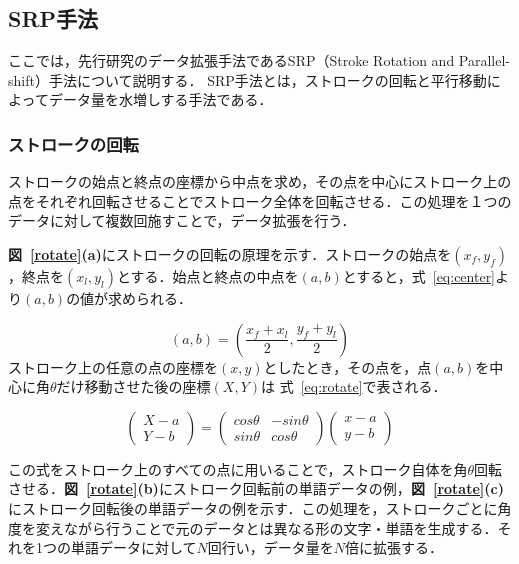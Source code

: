 \subsection{SRP手法}
ここでは，先行研究\cite{takahashi}のデータ拡張手法であるSRP（Stroke Rotation and Parallel-shift）手法について説明する．
SRP手法とは，ストロークの回転と平行移動によってデータ量を水増しする手法である．
\subsubsection{ストロークの回転}
ストロークの始点と終点の座標から中点を求め，その点を中心にストローク上の点をそれぞれ回転させることでストローク全体を回転させる．この処理を１つのデータに対して複数回施すことで，データ拡張を行う．

\textbf{図~\ref{rotate}(a)}にストロークの回転の原理を示す．ストロークの始点を$(x_f, y_f)$，終点を$(x_l, y_l)$とする．始点と終点の中点を$(a, b)$とすると，式~\ref{eq:center}より$(a, b)$の値が求められる．

\begin{equation}
  (a, b) = (\frac{x_f+x_l}{2}, \frac{y_f+y_l}{2})
  \label{eq:center}
\end{equation}
ストローク上の任意の点の座標を$(x, y)$としたとき，その点を，点$(a, b)$を中心に角$\theta$だけ移動させた後の座標$(X, Y)$は 式~\ref{eq:rotate}で表される．

\begin{equation}
  \left(
    \begin{array}{r}
        X-a \\
        Y-b
    \end{array}
    \right)
 = \left(
  \begin{array}{rr}
      cos\theta & -sin\theta \\
      sin\theta & cos\theta
  \end{array}
  \right)
  \left(
    \begin{array}{r}
        x-a \\
        y-b
    \end{array}
    \right)
  \label{eq:rotate}
\end{equation}

この式をストローク上のすべての点に用いることで，ストローク自体を角$\theta$回転させる．\textbf{図~\ref{rotate}(b)}にストローク回転前の単語データの例，\textbf{図~\ref{rotate}(c)}にストローク回転後の単語データの例を示す．この処理を，ストロークごとに角度を変えながら行うことで元のデータとは異なる形の文字・単語を生成する．それを1つの単語データに対して$N$回行い，データ量を$N$倍に拡張する．

